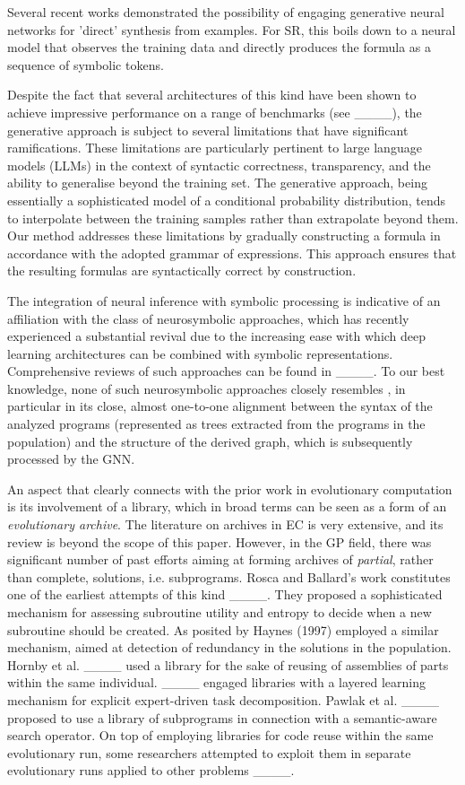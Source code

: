 Several recent works demonstrated the possibility of engaging generative neural networks for 'direct' synthesis from examples. For SR, this boils down to a neural model that observes the training data and directly produces the formula as a sequence of symbolic tokens. 

Despite the fact that several architectures of this kind have been shown to achieve impressive performance on a range of benchmarks (see ____), the generative approach is subject to several limitations that have significant ramifications. These limitations are particularly pertinent to large language models (LLMs) in the context of syntactic correctness, transparency, and the ability to generalise beyond the training set. The generative approach, being essentially a sophisticated model of a conditional probability distribution, tends to interpolate between the training samples rather than extrapolate beyond them. Our method addresses these limitations by gradually constructing a formula in accordance with the adopted grammar of expressions. This approach ensures that the resulting formulas are syntactically correct by construction.  

The integration of neural inference with symbolic processing is indicative of an affiliation with the class of neurosymbolic approaches, which has recently experienced a substantial revival due to the increasing ease with which deep learning architectures can be combined with symbolic representations. Comprehensive reviews of such approaches can be found in ____. To our best knowledge, none of such neurosymbolic approaches closely resembles \mname, in particular in its close, almost one-to-one alignment between the syntax of the analyzed programs (represented as trees extracted from the programs in the population) and the structure of the derived graph, which is subsequently processed by the GNN. 


An aspect that clearly connects \mname with the prior work in evolutionary computation is its involvement of a library, which in broad terms can be seen as a form of an \emph{evolutionary archive}. The literature on archives in EC is very extensive, and its review is beyond the scope of this paper. However, in the GP field, there was significant number of past efforts aiming at forming archives of \emph{partial}, rather than complete, solutions, i.e. subprograms. Rosca and Ballard's work constitutes one of the earliest attempts of this kind ____. They proposed a sophisticated mechanism for assessing subroutine utility and entropy to decide when a new subroutine should be created.  As posited by Haynes (1997) employed a similar mechanism, aimed at detection of redundancy in the solutions in the population. Hornby et al. ____ used  a library for the sake of reusing of assemblies of parts within the same individual. ____ engaged libraries with a layered learning mechanism for explicit expert-driven task decomposition. Pawlak et al. ____ proposed to use a library of subprograms in connection with a semantic-aware search operator. On top of employing libraries for code reuse within the same evolutionary run, some researchers attempted to exploit them in separate evolutionary runs applied to other problems ____.